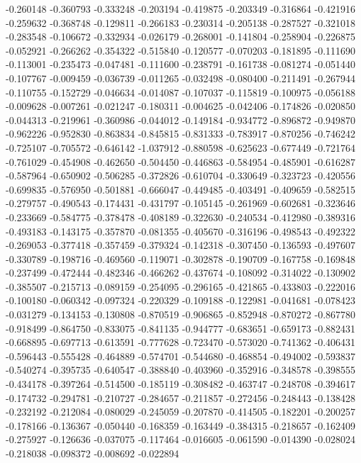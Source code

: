 -0.260148
-0.360793
-0.333248
-0.203194
-0.419875
-0.203349
-0.316864
-0.421916
-0.259632
-0.368748
-0.129811
-0.266183
-0.230314
-0.205138
-0.287527
-0.321018
-0.283548
-0.106672
-0.332934
-0.026179
-0.268001
-0.141804
-0.258904
-0.226875
-0.052921
-0.266262
-0.354322
-0.515840
-0.120577
-0.070203
-0.181895
-0.111690
-0.113001
-0.235473
-0.047481
-0.111600
-0.238791
-0.161738
-0.081274
-0.051440
-0.107767
-0.009459
-0.036739
-0.011265
-0.032498
-0.080400
-0.211491
-0.267944
-0.110755
-0.152729
-0.046634
-0.014087
-0.107037
-0.115819
-0.100975
-0.056188
-0.009628
-0.007261
-0.021247
-0.180311
-0.004625
-0.042406
-0.174826
-0.020850
-0.044313
-0.219961
-0.360986
-0.044012
-0.149184
-0.934772
-0.896872
-0.949870
-0.962226
-0.952830
-0.863834
-0.845815
-0.831333
-0.783917
-0.870256
-0.746242
-0.725107
-0.705572
-0.646142
-1.037912
-0.880598
-0.625623
-0.677449
-0.721764
-0.761029
-0.454908
-0.462650
-0.504450
-0.446863
-0.584954
-0.485901
-0.616287
-0.587964
-0.650902
-0.506285
-0.372826
-0.610704
-0.330649
-0.323723
-0.420556
-0.699835
-0.576950
-0.501881
-0.666047
-0.449485
-0.403491
-0.409659
-0.582515
-0.279757
-0.490543
-0.174431
-0.431797
-0.105145
-0.261969
-0.602681
-0.323646
-0.233669
-0.584775
-0.378478
-0.408189
-0.322630
-0.240534
-0.412980
-0.389316
-0.493183
-0.143175
-0.357870
-0.081355
-0.405670
-0.316196
-0.498543
-0.492322
-0.269053
-0.377418
-0.357459
-0.379324
-0.142318
-0.307450
-0.136593
-0.497607
-0.330789
-0.198716
-0.469560
-0.119071
-0.302878
-0.190709
-0.167758
-0.169848
-0.237499
-0.472444
-0.482346
-0.466262
-0.437674
-0.108092
-0.314022
-0.130902
-0.385507
-0.215713
-0.089159
-0.254095
-0.296165
-0.421865
-0.433803
-0.222016
-0.100180
-0.060342
-0.097324
-0.220329
-0.109188
-0.122981
-0.041681
-0.078423
-0.031279
-0.134153
-0.130808
-0.870519
-0.906865
-0.852948
-0.870272
-0.867780
-0.918499
-0.864750
-0.833075
-0.841135
-0.944777
-0.683651
-0.659173
-0.882431
-0.668895
-0.697713
-0.613591
-0.777628
-0.723470
-0.573020
-0.741362
-0.406431
-0.596443
-0.555428
-0.464889
-0.574701
-0.544680
-0.468854
-0.494002
-0.593837
-0.540274
-0.395735
-0.640547
-0.388840
-0.403960
-0.352916
-0.348578
-0.398555
-0.434178
-0.397264
-0.514500
-0.185119
-0.308482
-0.463747
-0.248708
-0.394617
-0.174732
-0.294781
-0.210727
-0.284657
-0.211857
-0.272456
-0.248443
-0.138428
-0.232192
-0.212084
-0.080029
-0.245059
-0.207870
-0.414505
-0.182201
-0.200257
-0.178166
-0.136367
-0.050440
-0.168359
-0.163449
-0.384315
-0.218657
-0.162409
-0.275927
-0.126636
-0.037075
-0.117464
-0.016605
-0.061590
-0.014390
-0.028024
-0.218038
-0.098372
-0.008692
-0.022894
